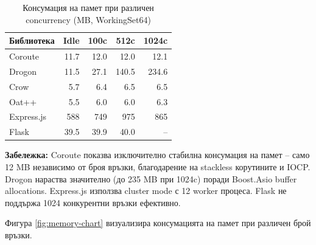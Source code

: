 \begin{table}[H]
\centering
\caption{Консумация на памет при различен concurrency (MB, WorkingSet64)}
\label{tab:memory}
\begin{tabular}{|l|r|r|r|r|}
\hline
\textbf{Библиотека} & \textbf{Idle} & \textbf{100c} & \textbf{512c} & \textbf{1024c} \\
\hline
Coroute & 11.7 & 12.0 & 12.0 & 12.1 \\
Drogon & 11.5 & 27.1 & 140.5 & 234.6 \\
Crow & 5.7 & 6.4 & 6.5 & 6.5 \\
Oat++ & 5.5 & 6.0 & 6.0 & 6.3 \\
Express.js & 588 & 749 & 975 & 865 \\
Flask & 39.5 & 39.9 & 40.0 & -- \\
\hline
\end{tabular}
\end{table}

\textbf{Забележка:} Coroute показва изключително стабилна консумация на памет -- само 12 MB независимо от броя връзки, благодарение на stackless корутините и IOCP. Drogon нараства значително (до 235 MB при 1024c) поради Boost.Asio buffer allocations. Express.js използва cluster mode с 12 worker процеса. Flask не поддържа 1024 конкурентни връзки ефективно.

Фигура \ref{fig:memory-chart} визуализира консумацията на памет при различен брой връзки.


